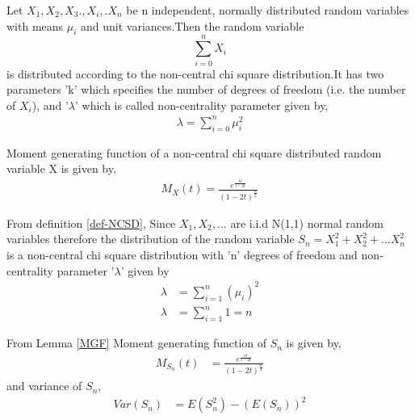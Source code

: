 \documentclass[journal,12pt,twocolumn]{IEEEtran}
\begin{document}
\begin{definition}
Let $X_{1},X_{2},X_{3}.,X_{i},.X_{n}$ be n independent, normally distributed random variables with means $\mu_{i}$ and unit variances.Then the random variable
$$\sum_{i=0}^{n}X_{i}$$ is distributed according to the non-central chi square distribution.It has two parameters 'k' which specifies the number of degrees of freedom (i.e. the number of $X_{i}$), and '$\lambda$' which is called non-centrality parameter given by,
\begin{align}
    \lambda=\sum_{i=0}^{n}\mu_{i}^2
\end{align}
\label{def-NCSD}
\end{definition}
\begin{lemma}
Moment generating function of a non-central chi square distributed random variable X is given by,
\begin{align}
    M_{X}(t)=\frac{e^{\frac{\lambda t}{1-2t}}}{(1-2t)^{\frac{n}{2}}}
\end{align}
\label{MGF}
\end{lemma}
From definition \ref{def-NCSD},
Since $X_{1},X_{2},...$ are i.i.d N(1,1) normal random variables therefore the distribution of the random variable $S_{n}=X_{1}^{2}+X_{2}^{2}+...X_{n}^{2}$ is a non-central chi square distribution with 'n' degrees of freedom and non-centrality parameter '$\lambda$' given by
\begin{align}
    \lambda&=\sum_{i=1}^{n}(\mu_{i})^{2}
    \\\lambda&=\sum_{i=1}^{n}1=n
\end{align}

From Lemma \ref{MGF} Moment generating function of $S_{n}$ is given by,
\begin{align}
    M_{S_{n}}(t)&=\frac{e^{\frac{n t}{1-2t}}}{(1-2t)^{\frac{n}{2}}}
\end{align}
and variance of $S_{n}$,
\begin{align}
Var(S_{n})&=E(S_{n}^2)-(E(S_{n}))^2
\label{1}
\end{align}
\end{document}
